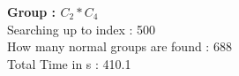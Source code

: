 \textbf{Group : $C_2*C_4$}\\
Searching up to index : 500\\
How many normal groups are found : 688\\
Total Time in s : 410.1\\
